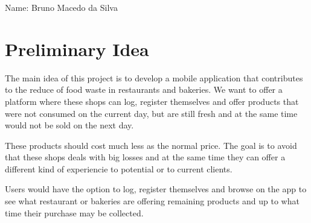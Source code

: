 \documentclass[pdftex, a4paper]{scrartcl}
\begin{document}
Name: Bruno Macedo da Silva

\section{Preliminary Idea}

The main idea of this project is to develop a mobile application that contributes to the reduce of food waste 
in restaurants and bakeries. We want to offer a platform where these shops can log, register themselves and offer
products that were not consumed on the current day, but are still fresh and at the same time would not be sold on 
the next day. 

These products should cost much less as the normal price. The goal is to avoid that these shops deals with big losses 
and at the same time they can offer a different kind of experiencie to potential or to current clients.

Users would have the option to log, register themselves and browse on the app to see what restaurant or bakeries
are offering remaining products and up to what time their purchase may be collected.
\end{document}
